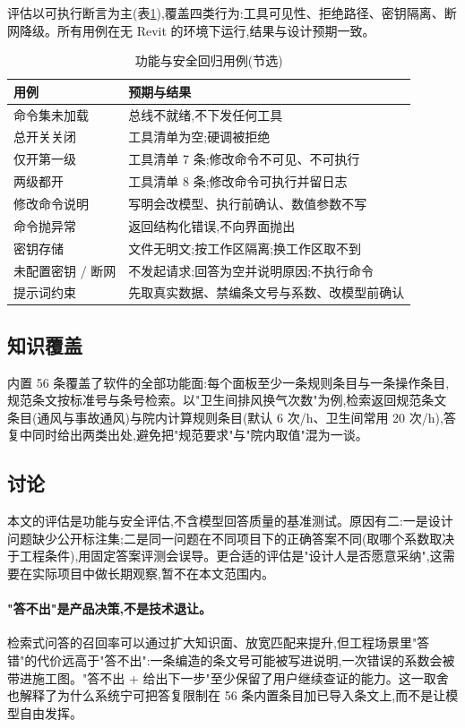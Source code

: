 \documentclass[UTF8,a4paper,zihao=-4]{ctexart}
\begin{document}
评估以可执行断言为主(表\ref{tab:tests}),覆盖四类行为:工具可见性、拒绝路径、密钥隔离、断网降级。所有用例在无 Revit 的环境下运行,结果与设计预期一致。

\begin{table}[H]
\centering
\caption{功能与安全回归用例(节选)}\label{tab:tests}
\small
\begin{tabular}{p{6.4cm}p{7.4cm}}
\toprule
用例 & 预期与结果 \\
\midrule
命令集未加载 & 总线不就绪,不下发任何工具 \\
总开关关闭 & 工具清单为空;硬调被拒绝 \\
仅开第一级 & 工具清单 7 条;修改命令不可见、不可执行 \\
两级都开 & 工具清单 8 条;修改命令可执行并留日志 \\
修改命令说明 & 写明会改模型、执行前确认、数值参数不写 \\
命令抛异常 & 返回结构化错误,不向界面抛出 \\
密钥存储 & 文件无明文;按工作区隔离;换工作区取不到 \\
未配置密钥 / 断网 & 不发起请求;回答为空并说明原因;不执行命令 \\
提示词约束 & 先取真实数据、禁编条文号与系数、改模型前确认 \\
\bottomrule
\end{tabular}
\end{table}

\subsection{知识覆盖}

内置 56 条覆盖了软件的全部功能面:每个面板至少一条规则条目与一条操作条目,规范条文按标准号与条号检索。以"卫生间排风换气次数"为例,检索返回规范条文条目(通风与事故通风)与院内计算规则条目(默认 6 次/h、卫生间常用 20 次/h),答复中同时给出两类出处,避免把"规范要求"与"院内取值"混为一谈。

\subsection{讨论}

本文的评估是功能与安全评估,不含模型回答质量的基准测试。原因有二:一是设计问题缺少公开标注集;二是同一问题在不同项目下的正确答案不同(取哪个系数取决于工程条件),用固定答案评测会误导。更合适的评估是"设计人是否愿意采纳",这需要在实际项目中做长期观察,暂不在本文范围内。

\paragraph{"答不出"是产品决策,不是技术退让。}
检索式问答的召回率可以通过扩大知识面、放宽匹配来提升,但工程场景里"答错"的代价远高于"答不出":一条编造的条文号可能被写进说明,一次错误的系数会被带进施工图。"答不出 + 给出下一步"至少保留了用户继续查证的能力。这一取舍也解释了为什么系统宁可把答复限制在 56 条内置条目加已导入条文上,而不是让模型自由发挥。
\end{document}
